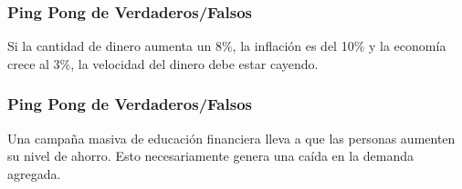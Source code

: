 \documentclass{beamer}
\begin{document}
\begin{frame}
\frametitle{Ping Pong de Verdaderos/Falsos}
\centering
Si la cantidad de dinero aumenta un 8\%, la inflación es del 10\% y la economía crece al 3\%, la velocidad del dinero debe estar cayendo.
\end{frame}

\begin{frame}
\frametitle{Ping Pong de Verdaderos/Falsos}
\centering
Una campaña masiva de educación financiera lleva a que las personas aumenten su nivel de ahorro. Esto necesariamente genera una caída en la demanda agregada.
\end{frame}



\begin{comment}
\begin{frame}{Repaso: Monopolio}
    \begin{itemize}
        \item Una unica empresa vende un bien o servicio sin sustitutos cercanos.
        \item La empresa enfrenta la curva de demanda del mercado.
        \item La regla de maximización es siempre la misma: $IMg=CMg$, solo que en competencia perfecta $IMg = P$ y acá $IMg \neq P$.
    \end{itemize}
    Consideremos el siguiente ejemplo:
    \begin{itemize}
        \item Un monopolista enfrenta la curva de demanda \( p = 120 - 2q \). Además, su curva de costo total es \( CT(q) = 20 + 5q + q^2 \), siendo su correspondiente curva de costo marginal \( CMg(q) = 5 + 2q \).

        \begin{enumerate}
            \item ¿Cuánto producirá el monopolista y a qué precio venderá este bien si desea maximizar su beneficio?
            \item ¿Cuál es el máximo beneficio que puede obtener?
            \item ¿Cuál sería la cantidad que ofrecería este monopolista si se comportara como una empresa perfectamente competitiva?
            \item ¿Cuál es el costo de eficiencia del monopolio? Grafique.
        \end{enumerate}
    \end{itemize}
\end{frame}


\end{comment}
\end{document}
